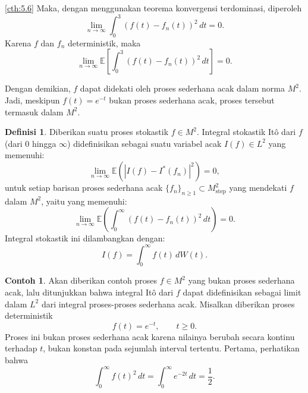 \documentclass[aspectratio=169,11pt]{beamer}
\theoremstyle{definition}
\newtheorem{definisi}{Definisi}
\newtheorem{contoh}{Contoh}
\newcommand{\myref}[1]{\hyperref[#1]{\nameCref{#1} \ref*{#1}}}
\begin{document}
\begin{frame}{\insertsection}{\insertsubsection}
  \begin{exampleblock}{\myref{cth:5.6}}
    Maka, dengan menggunakan teorema konvergensi terdominasi, diperoleh
    \[
      \lim_{n\to\infty}
      \int_0^3 (f(t)-f_n(t))^2\,dt
      =
      0.
    \]
    Karena $f$ dan $f_n$ deterministik, maka
    \[
      \lim_{n\to\infty}
      \mathbb{E}\left[
        \int_0^3 (f(t)-f_n(t))^2\,dt
        \right]
      =
      0.
    \]

    Dengan demikian, $f$ dapat didekati oleh proses sederhana acak dalam norma
    $M^2$. Jadi, meskipun $f(t)=e^{-t}$ bukan proses sederhana acak, proses tersebut
    termasuk dalam $M^2$.
  \end{exampleblock}
\end{frame}

\begin{frame}{\insertsection}{\insertsubsection}
  \begin{definisi}
    Diberikan suatu proses stokastik $f \in M^2$. Integral stokastik Itô dari $f$ (dari $0$ hingga $\infty$) didefinisikan sebagai suatu variabel acak $I(f) \in L^2$ yang memenuhi:
    \begin{equation*}
      \lim_{n \to \infty} \mathbb{E}\left(|I(f) - I^*(f_n)|^2\right) = 0,
    \end{equation*}
    untuk setiap barisan proses sederhana acak $\{f_n\}_{n \geq 1} \subset M_{\text{step}}^2$ yang mendekati $f$ dalam $M^2$, yaitu yang memenuhi:
    \begin{equation*}
      \lim_{n \to \infty} \mathbb{E}\left(\int_0^\infty (f(t) - f_n(t))^2 \, dt\right) = 0.
    \end{equation*}
    Integral stokastik ini dilambangkan dengan:
    \begin{equation*}
      I(f) = \int_0^\infty f(t) \, dW(t).
    \end{equation*}
  \end{definisi}
\end{frame}

\begin{frame}{\insertsection}{\insertsubsection}
  \begin{contoh}\label{cth:5.7}
    Akan diberikan contoh proses $f\in M^2$ yang bukan proses sederhana acak, lalu
    ditunjukkan bahwa integral Itô dari $f$ dapat didefinisikan sebagai limit dalam
    $L^2$ dari integral proses-proses sederhana acak.
    Misalkan diberikan proses deterministik
    \[
      f(t)=e^{-t},
      \qquad t\geq 0.
    \]
    Proses ini bukan proses sederhana acak karena nilainya berubah secara kontinu
    terhadap $t$, bukan konstan pada sejumlah interval tertentu.
    Pertama, perhatikan bahwa
    \[
      \int_0^\infty f(t)^2\,dt
      =
      \int_0^\infty e^{-2t}\,dt
      =
      \frac{1}{2}.
    \]
  \end{contoh}
\end{frame}
\end{document}
